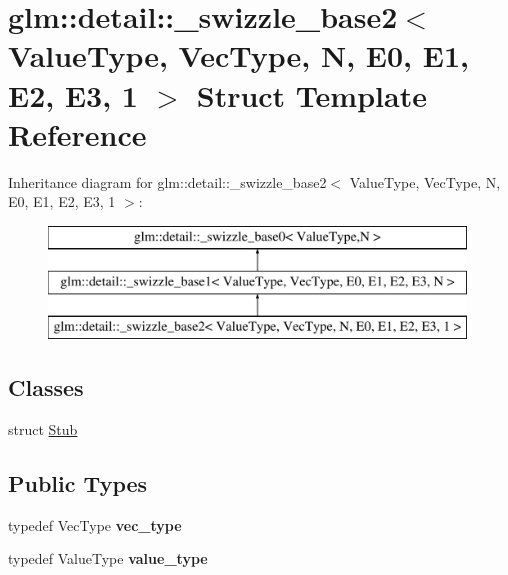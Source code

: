 \hypertarget{structglm_1_1detail_1_1__swizzle__base2_3_01ValueType_00_01VecType_00_01N_00_01E0_00_01E1_00_01E2_00_01E3_00_011_01_4}{\section{glm\-:\-:detail\-:\-:\-\_\-swizzle\-\_\-base2$<$ \-Value\-Type, \-Vec\-Type, \-N, \-E0, \-E1, \-E2, \-E3, 1 $>$ \-Struct \-Template \-Reference}
\label{structglm_1_1detail_1_1__swizzle__base2_3_01ValueType_00_01VecType_00_01N_00_01E0_00_01E1_00_01E2_00_01E3_00_011_01_4}
}
\-Inheritance diagram for glm\-:\-:detail\-:\-:\-\_\-swizzle\-\_\-base2$<$ \-Value\-Type, \-Vec\-Type, \-N, \-E0, \-E1, \-E2, \-E3, 1 $>$\-:\begin{figure}[H]
\begin{center}
\leavevmode
\includegraphics[height=3.000000cm]{structglm_1_1detail_1_1__swizzle__base2_3_01ValueType_00_01VecType_00_01N_00_01E0_00_01E1_00_01E2_00_01E3_00_011_01_4}
\end{center}
\end{figure}
\subsection*{\-Classes}
\begin{DoxyCompactItemize}
\item 
struct \hyperlink{structglm_1_1detail_1_1__swizzle__base2_3_01ValueType_00_01VecType_00_01N_00_01E0_00_01E1_00_01E2_00_01E3_00_011_01_4_1_1Stub}{\-Stub}
\end{DoxyCompactItemize}
\subsection*{\-Public \-Types}
\begin{DoxyCompactItemize}
\item 
\hypertarget{structglm_1_1detail_1_1__swizzle__base2_3_01ValueType_00_01VecType_00_01N_00_01E0_00_01E1_00_01E2_00_01E3_00_011_01_4_ad2442863b7e1573d71bf4af4e717a819}{typedef \-Vec\-Type {\bfseries vec\-\_\-type}}\label{structglm_1_1detail_1_1__swizzle__base2_3_01ValueType_00_01VecType_00_01N_00_01E0_00_01E1_00_01E2_00_01E3_00_011_01_4_ad2442863b7e1573d71bf4af4e717a819}

\item 
\hypertarget{structglm_1_1detail_1_1__swizzle__base2_3_01ValueType_00_01VecType_00_01N_00_01E0_00_01E1_00_01E2_00_01E3_00_011_01_4_a6af089fbf34a725330bea0092ee34768}{typedef \-Value\-Type {\bfseries value\-\_\-type}}\label{structglm_1_1detail_1_1__swizzle__base2_3_01ValueType_00_01VecType_00_01N_00_01E0_00_01E1_00_01E2_00_01E3_00_011_01_4_a6af089fbf34a725330bea0092ee34768}

\end{DoxyCompactItemize}
